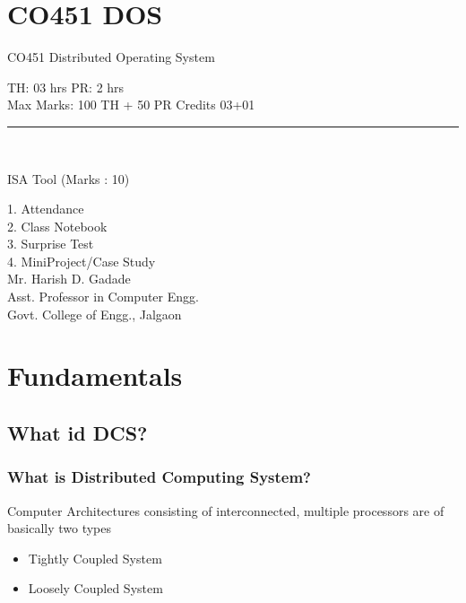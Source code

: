 \documentclass{beamer}
\begin{document}
   


\section{CO451 DOS}
\begin{frame}
\begin{center}
\huge CO451 Distributed Operating System\\
\end{center}
TH: 03 hrs
\hspace{5cm}
PR: 2 hrs\\
Max Marks: 100 TH + 50 PR
\hspace{2cm}
Credits 03+01\\
\noindent\rule{10.5cm}{0.4pt}\\
\begin{center}
ISA Tool (Marks : 10)\\
\end{center}
\hspace{2cm}1. Attendance\\
\hspace{2cm}2. Class Notebook\\
\hspace{2cm}3. Surprise Test\\
\hspace{2cm}4. MiniProject/Case Study\\
\vspace{1cm}
\hspace{6cm}Mr. Harish D. Gadade\\
\hspace{5cm}Asst. Professor in Computer Engg.\\
\hspace{5.2cm}Govt. College of Engg., Jalgaon
\end{frame} 



\section{Fundamentals}
\subsection{What id DCS?}
    \begin{frame}
        \frametitle{What is Distributed Computing System?}
            Computer Architectures consisting of interconnected, multiple processors are of basically two types
        \vspace{0.02cm}
        \begin{itemize}
        	\item Tightly Coupled System
            \item Loosely Coupled System
        \end{itemize}
        \vspace{5cm}
    \end{frame}
\end{document}
